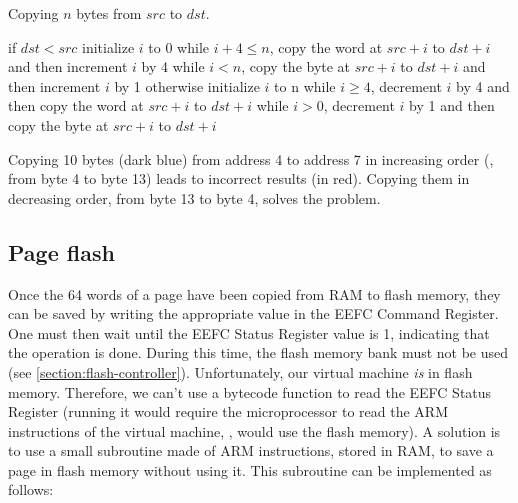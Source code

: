 \begin{Algorithm}
\caption{Copying $n$ bytes from $src$ to $dst$.}\label{alg:mem-copy}
\begin{algorithmic}[1]
\Begin if $dst < src$
  \State initialize $i$ to 0
  \State while $i+4 \le n$, copy the word at $src+i$ to $dst+i$ and then
  increment $i$ by 4
  \State while $i < n$, copy the byte at $src+i$ to $dst+i$ and then increment
  $i$ by 1
\Continue otherwise
  \State initialize $i$ to n
  \State while $i \ge 4$, decrement $i$ by 4 and then copy the word at $src+i$
  to $dst+i$
  \State while $i > 0$, decrement $i$ by 1 and then copy the byte at $src+i$ to
  $dst+i$
\End
\end{algorithmic}
\end{Algorithm}

\begin{Figure}
  

  \caption{Copying 10 bytes (dark blue) from address 4 to address 7 in
  increasing order (\ie, from byte 4 to byte 13) leads to incorrect results (in
  red). Copying them in decreasing order, from byte 13 to byte 4, solves the
  problem.}\label{fig:mem-copy}
\end{Figure}

\subsection{Page flash}\label{subsection:flash-subroutine}

Once the 64 words of a page have been copied from RAM to flash memory, they can
be saved by writing the appropriate value in the EEFC Command Register. One
must then wait until the EEFC Status Register value is 1, indicating that the
operation is done. During this time, the flash memory bank must not be used
(see \cref{section:flash-controller}). Unfortunately, our virtual machine {\em
is} in flash memory. Therefore, we can't use a bytecode function to read the
EEFC Status Register (running it would require the microprocessor to read the
ARM instructions of the virtual machine, \ie, would use the flash memory). A
solution is to use a small subroutine made of ARM instructions, stored in RAM,
to save a page in flash memory without using it. This subroutine can be
implemented as follows:


